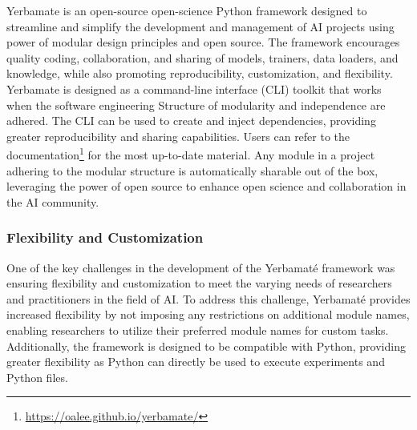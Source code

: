 

Yerbamate is an open-source open-science Python framework designed to streamline and simplify the development and management of AI projects using power of modular design principles and open source. The framework encourages quality coding, collaboration, and sharing of models, trainers, data loaders, and knowledge, while also promoting reproducibility, customization, and flexibility. 
Yerbamate is designed as a command-line interface (CLI) toolkit that works when the software engineering Structure of modularity and independence are adhered. The CLI can be used to create and inject dependencies, providing greater reproducibility and sharing capabilities. 
Users can refer to the documentation\footnote{\url{https://oalee.github.io/yerbamate/}} for the most up-to-date material. Any module in a project adhering to the modular structure is automatically sharable out of the box, leveraging the power of open source to enhance open science and collaboration in the AI community.

\subsubsection{Flexibility and Customization}

One of the key challenges in the development of the Yerbamaté framework was ensuring flexibility and customization to meet the varying needs of researchers and practitioners in the field of AI. To address this challenge, Yerbamaté provides increased flexibility by not imposing any restrictions on additional module names, enabling researchers to utilize their preferred module names for custom tasks. 
Additionally, the framework is designed to be compatible with Python, providing greater flexibility as Python can directly be used to execute experiments and Python files.


